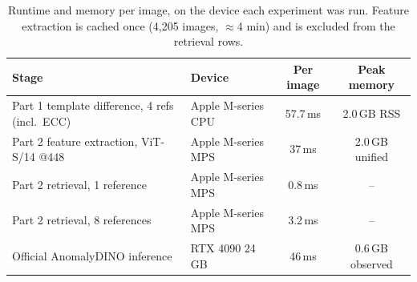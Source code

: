 \begin{table}[t]
\centering
\small
\begin{tabular}{llcc}
\toprule
Stage & Device & Per image & Peak memory \\
\midrule
Part 1 template difference, 4 refs (incl.\ ECC) & Apple M-series CPU & 57.7\,ms & 2.0\,GB RSS \\
Part 2 feature extraction, ViT-S/14 @448 & Apple M-series MPS & 37\,ms & 2.0\,GB unified \\
Part 2 retrieval, 1 reference & Apple M-series MPS & 0.8\,ms & -- \\
Part 2 retrieval, 8 references & Apple M-series MPS & 3.2\,ms & -- \\
Official AnomalyDINO inference & RTX 4090 24\,GB & 46\,ms & 0.6\,GB observed \\
\bottomrule
\end{tabular}
\caption{Runtime and memory per image, on the device each experiment was run. Feature extraction is cached once (4,205 images, $\approx$4 min) and is excluded from the retrieval rows.}
\label{tab:efficiency}
\end{table}